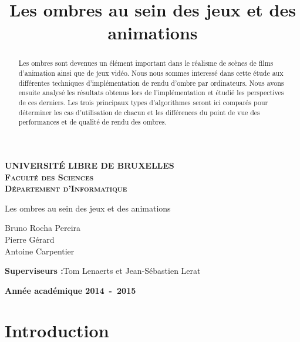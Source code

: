 \documentclass[a4paper,10pt]{report}
\title{Les ombres au sein des jeux et des animations}
\begin{document}
\newcommand*{\captionsource}[2]{%
  \caption[{#1}]{%
    #1%
    \\\hspace{\linewidth}%
    \textbf{Source:} #2%
  }%
}



\begin{titlepage}
\begin{center}
\textbf{\textsc{UNIVERSIT\'E LIBRE DE BRUXELLES}}\\
\textbf{\textsc{Faculté des Sciences}}\\
\textbf{\textsc{Département d'Informatique}}
\vfill{}\vfill{}
\begin{center}{\Huge Les ombres au sein des jeux et des animations}\end{center}{\Huge \par}
\begin{center}{\large Bruno Rocha Pereira\\ Pierre Gérard\\ Antoine Carpentier}\end{center}{\Huge \par}
\vfill{}\vfill{}
\begin{flushleft}{\large \textbf{Superviseurs :}}\hfill{Tom Lenaerts et Jean-Sébastien Lerat}\end{flushleft}{\large\par}
\vfill{}\vfill{}\enlargethispage{3cm}
\textbf{Année académique 2014~-~2015}
\end{center}
\end{titlepage}

\begin{abstract}
Les ombres sont devenues un élément important dans le réalisme de scènes de films d'animation ainsi que de jeux vidéo. Nous nous sommes interessé dans cette étude aux différentes techniques d'implémentation de rendu d'ombre par ordinateurs. Nous avons ensuite analysé les résultats obtenus lors de l'implémentation et étudié les perspectives de ces derniers. Les trois principaux types d'algorithmes seront ici comparés pour déterminer les cas d'utilisation de chacun et les différences du point de vue des performances et de qualité de rendu des ombres.
\end{abstract}



\tableofcontents


\chapter{Introduction}
\end{document}
